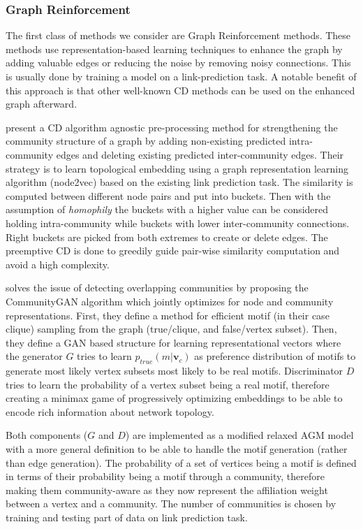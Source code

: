\documentclass[
acmsmall,
nonacm,
screen,
acmthm]{../../scripts/pandoc/templates/acmart}
\begin{document}
\hypertarget{graph-reinforcement}{%
\subsubsection{Graph Reinforcement}\label{graph-reinforcement}}

The first class of methods we consider are Graph Reinforcement methods.
These methods use representation-based learning techniques to enhance
the graph by adding valuable edges or reducing the noise by removing
noisy connections. This is usually done by training a model on a
link-prediction task. A notable benefit of this approach is that other
well-known CD methods can be used on the enhanced graph afterward.

\citet{kangCommunityReinforcementEffective2021} present a CD algorithm
agnostic pre-processing method for strengthening the community structure
of a graph by adding non-existing predicted intra-community edges and
deleting existing predicted inter-community edges. Their strategy is to
learn topological embedding using a graph representation learning
algorithm (node2vec) based on the existing link prediction task. The
similarity is computed between different node pairs and put into
buckets. Then with the assumption of \emph{homophily} the buckets with a
higher value can be considered holding intra-community while buckets
with lower inter-community connections. Right buckets are picked from
both extremes to create or delete edges. The preemptive CD is done to
greedily guide pair-wise similarity computation and avoid a high
complexity.

\citet{jiaCommunityGANCommunityDetection2019} solves the issue of
detecting overlapping communities by proposing the CommunityGAN
algorithm which jointly optimizes for node and community
representations. First, they define a method for efficient motif (in
their case clique) sampling from the graph (true/clique, and
false/vertex subset). Then, they define a GAN based structure for
learning representational vectors where the generator \(G\) tries to
learn \(p_{true}(m|\mathbf{v}_c)\) as preference distribution of motifs
to generate most likely vertex subsets most likely to be real motifs.
Discriminator \(D\) tries to learn the probability of a vertex subset
being a real motif, therefore creating a minimax game of progressively
optimizing embeddings to be able to encode rich information about
network topology.

Both components (\(G\) and \(D\)) are implemented as a modified relaxed
AGM model with a more general definition to be able to handle the motif
generation (rather than edge generation). The probability of a set of
vertices being a motif is defined in terms of their probability being a
motif through a community, therefore making them community-aware as they
now represent the affiliation weight between a vertex and a community.
The number of communities is chosen by training and testing part of data
on link prediction task.
\end{document}
